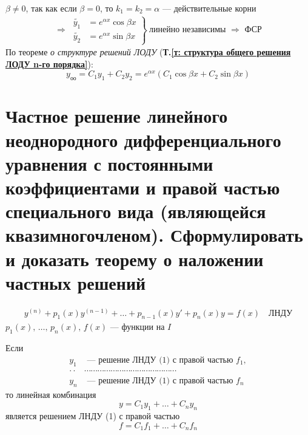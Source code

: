 $\beta \ne 0$, так как если $\beta = 0$, то $k_1 = k_2 = \alpha$ --- действительные корни
\begin{gather*}
    \Rightarrow\ \left. \begin{aligned}
        \widetilde{y_1} &= e^{\alpha x} \cos \beta x \\
        \widetilde{y_2} &= e^{\alpha x} \sin \beta x
    \end{aligned} \right\}\ \text{линейно независимы } \Rightarrow \text{ ФСР}
\end{gather*}
По теореме \textit{о структуре решений ЛОДУ} (\textbf{Т.\ref{т: структура общего решения ЛОДУ n-го порядка}}):
\[
    y_{\text{оо}} = C_1 y_1 + C_2 y  _2 = e^{\alpha x} \left(C_1 \cos \beta x + C_2 \sin \beta x\right)
\]

\section{Частное решение линейного неоднородного дифференциального уравнения с постоянными коэффициентами и правой частью специального вида (являющейся квазимногочленом). Сформулировать и доказать теорему о наложении частных решений}
\setcounter{equation}{0}
\begin{gather}
    y^{(n)} + p_1(x)y^{(n-1)} + \ldots + p_{n-1}(x) y' + p_n(x) y = f(x)\quad \text{ЛНДУ}
\end{gather}
$p_1(x),\, \ldots,\, p_n(x),\, f(x)$ --- функции на $I$ \\
\begin{theorem}
    Если \vspace{-\topsep}
    \begin{align*}
        y_1 &\text{ --- решение ЛНДУ (1) с правой частью } f_1, \\ 
        \cdot\cdot&\cdots\cdots\cdots\cdots\cdots\cdots\cdots\cdots\cdots\cdots\cdots\cdots\cdots\cdots \\
        y_n &\text{ --- решение ЛНДУ (1) с правой частью } f_n
    \end{align*}
    то линейная комбинация 
    \[
        y = C_1y_1 + \ldots + C_ny_n
    \]
    является решением ЛНДУ (1) с правой частью 
    \[
        f = C_1f_1 + \ldots + C_nf_n
    \]
\end{theorem}
